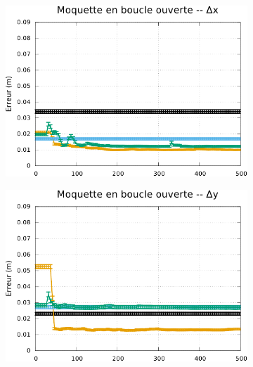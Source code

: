\begin{figure}[htb]
\begin{subfigure}{0.29\paperwidth}
        \centering
        \includegraphics[type=pdf,ext=.pdf,read=.pdf,width=1.0\linewidth]{../plot/OdometryLWPR/carpet_open_convergence_x}
    \end{subfigure}
    \begin{subfigure}{0.29\paperwidth}
        \centering
        \includegraphics[type=pdf,ext=.pdf,read=.pdf,width=1.0\linewidth]{../plot/OdometryLWPR/carpet_open_convergence_y}
    \end{subfigure}
    \begin{subfigure}{0.29\paperwidth}
        \centering

\end{subfigure}
\end{figure}
